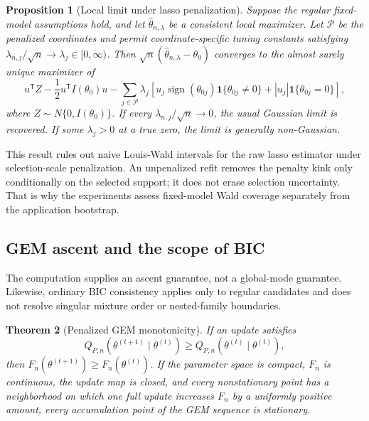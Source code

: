 \documentclass[a4paper,fleqn]{cas-sc}
\newtheorem{theorem}{Theorem}
\newtheorem{proposition}[theorem]{Proposition}
\newcommand{\ind}{\mathbf 1}
\newcommand{\T}{\mathsf T}
\newcommand{\PEN}{\mathcal P}
\begin{document}
\begin{proposition}[Local limit under lasso penalization]
\label{prop:lasso}
Suppose the regular fixed-model assumptions hold, and let $\widehat\theta_{n,\lambda}$ be a consistent local maximizer. Let $\PEN$ be the penalized coordinates and permit coordinate-specific tuning constants satisfying $\lambda_{n,j}/\sqrt n\to\lambda_j\in[0,\infty)$. Then $\sqrt n(\widehat\theta_{n,\lambda}-\theta_0)$ converges to the almost surely unique maximizer of
\begin{equation}
 u^\T Z-\frac12u^\T I(\theta_0)u-
 \sum_{j\in\PEN}\lambda_j
 \left[u_j\operatorname{sign}(\theta_{0j})\ind\{\theta_{0j}\neq0\}
 +|u_j|\ind\{\theta_{0j}=0\}\right],
 \label{eq:lasso-limit}
\end{equation}
where $Z\sim N\{0,I(\theta_0)\}$. If every $\lambda_{n,j}/\sqrt n\to0$, the usual Gaussian limit is recovered. If some $\lambda_j>0$ at a true zero, the limit is generally non-Gaussian.
\end{proposition}

This result rules out naive Louis-Wald intervals for the raw lasso estimator under selection-scale penalization. An unpenalized refit removes the penalty kink only conditionally on the selected support; it does not erase selection uncertainty. That is why the experiments assess fixed-model Wald coverage separately from the application bootstrap.

\subsection{GEM ascent and the scope of BIC}
\label{sec:algorithm-theory}

The computation supplies an ascent guarantee, not a global-mode guarantee. Likewise, ordinary BIC consistency applies only to regular candidates and does not resolve singular mixture order or nested-family boundaries.

\begin{theorem}[Penalized GEM monotonicity]
\label{thm:gem}
If an update satisfies
\[
 Q_{P,n}(\theta^{(t+1)}\mid\theta^{(t)})
 \geq Q_{P,n}(\theta^{(t)}\mid\theta^{(t)}),
\]
then $F_n(\theta^{(t+1)})\geq F_n(\theta^{(t)})$. If the parameter space is compact, $F_n$ is continuous, the update map is closed, and every nonstationary point has a neighborhood on which one full update increases $F_n$ by a uniformly positive amount, every accumulation point of the GEM sequence is stationary.
\end{theorem}
\end{document}
